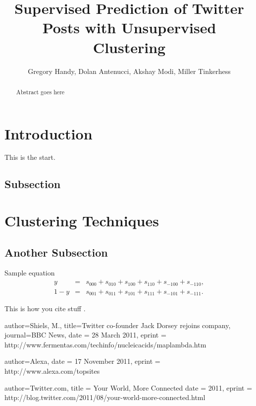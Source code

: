 \documentclass[12pt]{amsart}
\title{Supervised Prediction of Twitter Posts with Unsupervised Clustering}
\author{Gregory Handy, Dolan Antenucci, Akshay Modi, Miller Tinkerhess}
\begin{document}
\maketitle

\begin{abstract}
Abstract goes here
\end{abstract}


\section{Introduction}
This is the start.

\subsection{Subsection}


\section{Clustering Techniques}

\subsection{Another Subsection}
Sample equation
\begin{eqnarray}
	y &=& s_{000} + s_{010} + s_{100} + s_{110} + s_{-100} +s_{-110},   \nonumber\\
	1-y &=& s_{001} + s_{011} + s_{101} + s_{111} + s_{-101} +s_{-111}. \label{eqn:1-y}
\end{eqnarray}

 This is how you cite stuff \cite{shiels}.   

\begin{bibdiv}
\begin{biblist}

{
  author={Shiels, M.},    %
  title={Twitter co-founder Jack Dorsey rejoins company},
  journal={BBC News},
  date = {28 March 2011},
 eprint = {http://www.fermentas.com/techinfo/nucleicacids/maplambda.htm}
}

{
  author={Alexa},    %
  date = {17 November 2011},
 eprint = {http://www.alexa.com/topsites}
}

{
  author={Twitter.com},    %
  title = {Your World, More Connected}
  date = {2011},
 eprint = {http://blog.twitter.com/2011/08/your-world-more-connected.html}
}
 

\end{biblist}
\end{bibdiv}
\end{document}
